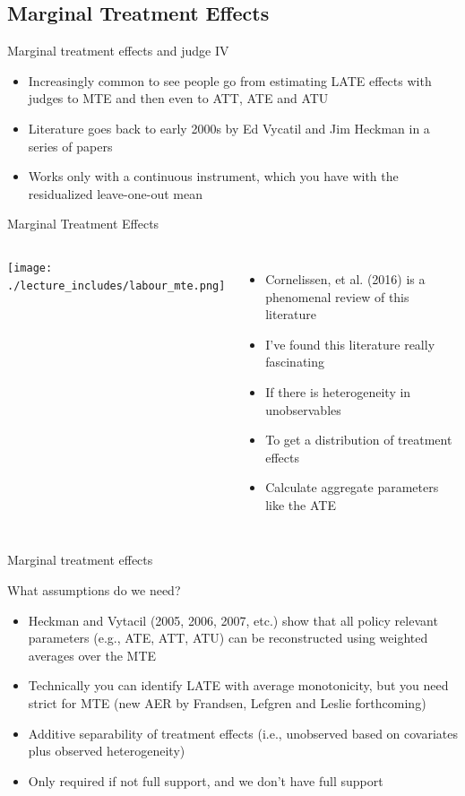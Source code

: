 \documentclass{beamer}
\begin{document}
\subsection{Marginal Treatment Effects}

\begin{frame}{Marginal treatment effects and judge IV}

\begin{itemize}

\item Increasingly common to see people go from estimating LATE effects with judges to MTE and then even to ATT, ATE and ATU
\item Literature goes back to early 2000s by Ed Vycatil and Jim Heckman in a series of papers
\item Works only with a continuous instrument, which you have with the residualized leave-one-out mean

\end{itemize}

\end{frame}


\begin{frame}{Marginal Treatment Effects}
       \begin{columns}
             \centering
             \texttt{[image: ./lecture\_includes/labour\_mte.png]}
		\begin{itemize}
	\item Cornelissen, et al. (2016) is a phenomenal review of this literature
	\item I've found this literature really fascinating
	\item If there is heterogeneity in unobservables
	\item To get a distribution of treatment effects
	\item Calculate aggregate parameters like the ATE
		\end{itemize}
         \end{columns} 
    \end{frame}





\begin{frame}{Marginal treatment effects}

What assumptions do we need? 
    	\begin{itemize}
	\item Heckman and Vytacil (2005, 2006, 2007, etc.) show that all policy relevant parameters (e.g., ATE, ATT, ATU) can be reconstructed using weighted averages over the MTE
   	\item Technically you can identify LATE with average monotonicity, but you need strict for MTE (new AER by Frandsen, Lefgren and Leslie forthcoming)
    	\item Additive separability of treatment effects (i.e., unobserved based on covariates plus observed heterogeneity)
    	\item Only required if not full support, and we don't have full support
	\end{itemize}

\end{frame}
\end{document}
